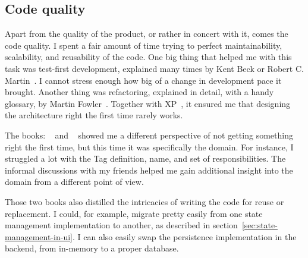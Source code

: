 \subsection{Code quality}\label{sec:code-quality}

Apart from the quality of the product,
or rather in concert with it,
comes the code quality.
I spent a fair amount of time trying
to perfect maintainability,
scalability,
and reusability of the code.
One big thing that helped me with this task
was test-first development,
explained many times by Kent Beck or
Robert C. Martin~\cite{beck_extreme_2004,beck_test-driven_2002,martin_clean_2011}.
I cannot stress enough how big
of a change in development pace it brought.
Another thing was refactoring,
explained in detail,
with a handy glossary,
by Martin Fowler~\cite{fowler_refactoring_2019}.
Together with \ac{XP}~\cite{beck_extreme_2004},
it ensured me that designing the architecture right
the first time rarely works.

The books:
~\cite{millett_patterns_2015}
and ~\cite{evans_domain-driven_2003}
showed me a different perspective
of not getting something right the first time,
but this time it was specifically the domain.
For instance,
I struggled a lot with the Tag definition,
name, and set of responsibilities.
The informal discussions with my friends
helped me gain additional insight into the domain
from a different point of view.

Those two books also distilled the intricacies
of writing the code for reuse or replacement.
I could, for example,
migrate pretty easily
from one state management implementation to another,
as described in section~\ref{sec:state-management-in-ui}.
I can also easily swap
the persistence implementation in the backend,
from in-memory to a proper database.
